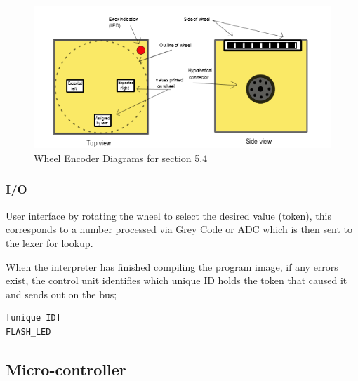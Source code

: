  \begin{figure}[H]
   \centering
 \includegraphics{BlkFace.png}
    \caption{Wheel Encoder Diagrams for section 5.4}
   \end{figure}

\subsubsection{I/O}
User interface by rotating the wheel to select the desired value (token), this corresponds to a number processed via Grey Code or ADC which is then sent to the lexer for lookup.

When the interpreter has finished compiling the program image, if any errors exist, the control unit identifies which unique ID holds the token that caused it and sends out on the bus;
\begin{verbatim}
[unique ID]
FLASH_LED
\end{verbatim}

\subsection{Micro-controller}

